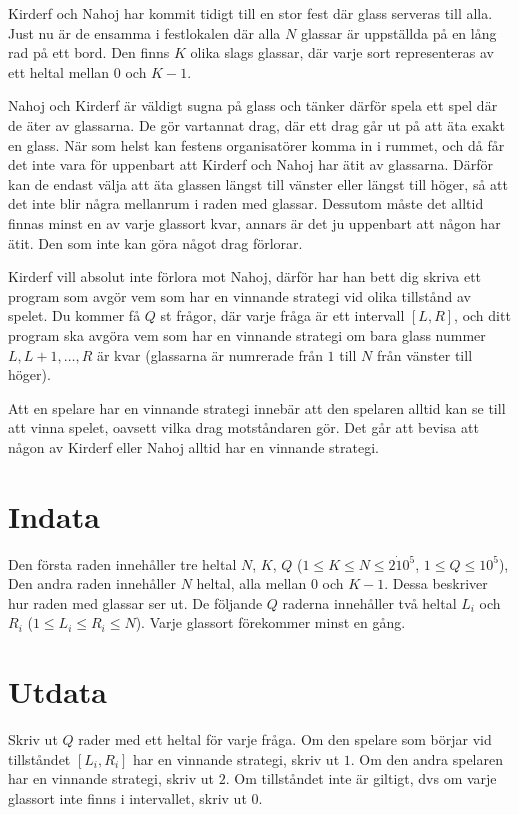 Kirderf och Nahoj har kommit tidigt till en stor fest där glass serveras till alla.
Just nu är de ensamma i festlokalen där alla $N$ glassar är uppställda på en lång rad på ett bord.
Den finns $K$ olika slags glassar, där varje sort representeras av ett heltal mellan $0$ och $K-1$.

Nahoj och Kirderf är väldigt sugna på glass och tänker därför spela ett spel där de äter av glassarna.
De gör vartannat drag, där ett drag går ut på att äta exakt en glass.
När som helst kan festens organisatörer komma in i rummet, och då får det inte vara för
uppenbart att Kirderf och Nahoj har ätit av glassarna. Därför kan de endast välja att
äta glassen längst till vänster eller längst till höger, så att det inte blir några mellanrum
i raden med glassar. Dessutom måste det alltid finnas minst en av varje glassort kvar,
annars är det ju uppenbart att någon har ätit. Den som inte kan göra något drag förlorar.

Kirderf vill absolut inte förlora mot Nahoj, därför har han bett dig skriva ett program som avgör vem som har en vinnande
strategi vid olika tillstånd av spelet. Du kommer få $Q$ st frågor, där varje fråga är ett intervall $[L,R]$, och 
ditt program ska avgöra vem som har en vinnande strategi om bara glass nummer $L, L+1, \dots, R$ är kvar (glassarna
är numrerade från $1$ till $N$ från vänster till höger).

Att en spelare har en vinnande strategi innebär att den spelaren alltid kan se till att vinna spelet,
oavsett vilka drag motståndaren gör. Det går att bevisa att någon av Kirderf eller Nahoj alltid har en vinnande strategi.

\section*{Indata}
Den första raden innehåller tre heltal $N$, $K$, $Q$ ($1 \le K \le N \le 2 \dot 10^5$, $1 \le Q \le 10^5$),
Den andra raden innehåller $N$ heltal, alla mellan $0$ och $K-1$. Dessa beskriver hur raden med glassar ser ut.
De följande $Q$ raderna innehåller två heltal $L_i$ och $R_i$ ($1 \le L_i \le R_i \le N$).
Varje glassort förekommer minst en gång.

\section*{Utdata}
Skriv ut $Q$ rader med ett heltal för varje fråga. Om den spelare som börjar vid tillståndet $[L_i, R_i]$ har en 
vinnande strategi, skriv ut $1$. Om den andra spelaren har en vinnande strategi, skriv ut $2$. Om tillståndet inte 
är giltigt, dvs om varje glassort inte finns i intervallet, skriv ut $0$.

